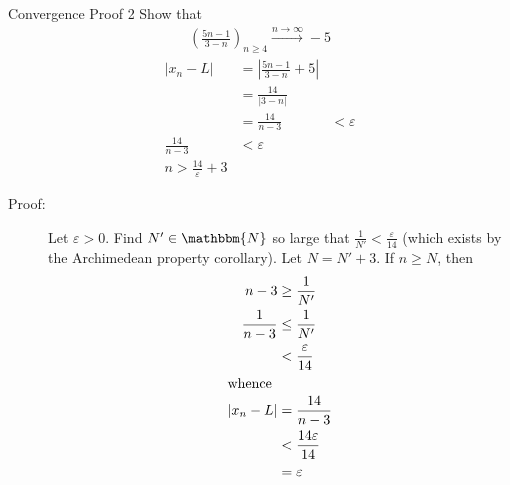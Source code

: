 \documentclass[10pt]{extarticle}
\newcommand{\N}{\mathbbm{N}}
\begin{document}
  \begin{problem}{Convergence Proof 2}
    Show that
    \begin{align*}
      \left(\frac{5n-1}{3-n}\right)_{n\geq 4} \xrightarrow{n\rightarrow\infty} -5
    \end{align*}
    \tcblower
    \begin{align*}
      |x_n - L| &= \left|\frac{5n-1}{3-n} + 5\right|\\
                &= \frac{14}{|3-n|}\\
                &= \frac{14}{n-3}
                &< \varepsilon\\
      \frac{14}{n-3} &< \varepsilon\\
      n > \frac{14}{\varepsilon} + 3
    \end{align*}
    \begin{description}
      \item[Proof:] Let $\varepsilon > 0$. Find $N' \in\N$ so large that $\frac{1}{N'} < \frac{\varepsilon}{14}$ (which exists by the Archimedean property corollary). Let $N = N' + 3$. If $n \geq N$, then
        \begin{align*}
          n-3 &\geq \frac{1}{N'}\\
          \frac{1}{n-3} &\leq \frac{1}{N'}\\
                        &< \frac{\varepsilon}{14}\\
                        \shortintertext{whence}
          |x_n - L| &= \frac{14}{n-3}\\
                    &< \frac{14\varepsilon}{14}\\
                    &= \varepsilon
        \end{align*}
    \end{description}
  \end{problem}
\end{document}
